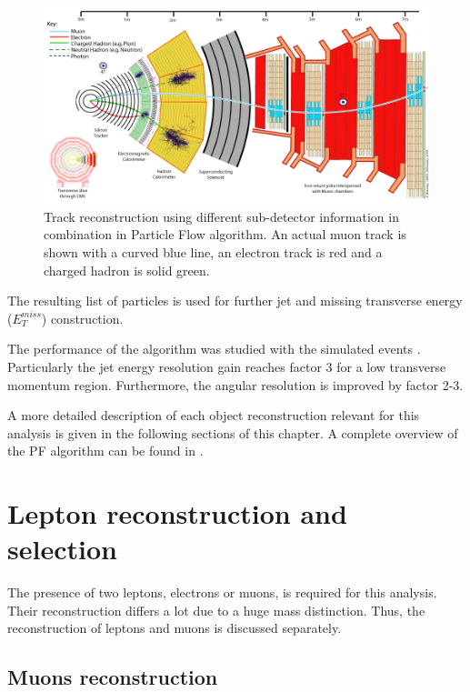 \begin{figure}[t]
  \centering
  \includegraphics[width=1.0\textwidth]{04_event_reconstruction/plots/CMS_Slice.png}
  \caption{Track reconstruction using different sub-detector information in combination in Particle Flow algorithm. An actual
  muon track is shown with a curved blue line, an electron track is red and a charged hadron is solid green.}
  \label{fig:PFmuons}
\end{figure}

The resulting list of particles is used for further jet and missing transverse energy ($E_{T}^{miss}$) construction. 

The performance of the algorithm was studied with the simulated events \cite{CMS-PAS-PFT-09-001}. Particularly the jet energy
resolution gain reaches factor 3 for a low transverse momentum region. Furthermore, the angular resolution is improved by factor 2-3.

A more detailed description of each object reconstruction relevant for this analysis is given in the following sections of this chapter.
A complete overview of the PF algorithm can be found in \cite{CMS-PAS-PFT-09-001}. 


\section{Lepton reconstruction and selection}

The presence of two leptons, electrons or muons, is required for this analysis. Their reconstruction
differs a lot due to a huge mass distinction. Thus, the reconstruction of leptons and muons is discussed separately.

\subsection{Muons reconstruction}

